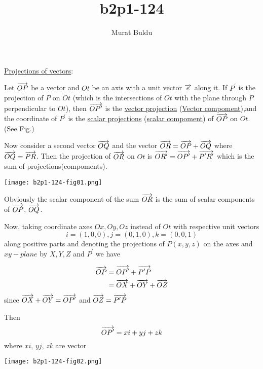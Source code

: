 \documentclass{amsbook}
\title{b2p1-124}
\author{Murat Buldu}
\begin{document}
\par
    \underline{Projections of vectors}:
\par
    Let \(\overrightarrow{OP}\) be a vector and \(Ot\) be an axis with a unit vector \(\overrightarrow{e}\) along it. If \(P^{\prime}\) is the projection of \(P\) on \(Ot\) (which is the intersections of \(Ot\) with the plane through \(P\) perpendicular to \(Ot\)), then \(\overrightarrow{OP^{\prime}}\) is the \underline{vector projection} (\underline{Vector compoment}),and the coordinate of \(P^{\prime}\) is the \underline{scalar projections} (\underline{scalar compoment}) of \(\overrightarrow{OP}\) on \(Ot\). (See Fig.)

\begin{minipage}{0.5\textwidth}
\par
Now consider a second vector \(\overrightarrow{OQ}\) and the vector \(\overrightarrow{OR} = \overrightarrow{OP} + \overrightarrow{OQ}\) where \(\overrightarrow{OQ} = \overrightarrow{PR}\). Then the projection of \(\overrightarrow{OR}\) on \(Ot\) is 
\(\overrightarrow{OR^{\prime}} = \overrightarrow{OP^{\prime}} + \overrightarrow{P^{\prime}R^{\prime}}\) which is the sum of projections(compoments).

\end{minipage}
\begin{minipage}{0.5\textwidth}
\texttt{[image: b2p1-124-fig01.png]}
\end{minipage}
\par
    Obviously the scalar component of the sum \(\overrightarrow{OR}\) is the sum of scalar components of \(\overrightarrow{OP}\), \(\overrightarrow{OQ}\).
\par
    Now, taking coordinate axes \(Ox, Oy, Oz\) instead of \(Ot\) with respective unit vectors
    \[i = (1,0,0), j = (0,1,0), k = (0,0,1) \]
    along positive parts and denoting the projections of \(P(x,y,z)\) on the axes and \(xy-plane\) by \(X,Y,Z\) and \(P^{\prime}\) we have
\par
\begin{minipage}{0.5\textwidth}
    \begin{align*} 
        \overrightarrow{OP} &= \overrightarrow{OP^{\prime}} + \overrightarrow{P^{\prime}P} \\ 
                &= \overrightarrow{OX} + \overrightarrow{OY} + \overrightarrow{OZ}
    \end{align*}
        since \(\overrightarrow{OX} + \overrightarrow{OY} = \overrightarrow{OP^{\prime}}\) and \(\overrightarrow{OZ} = \overrightarrow{P^{\prime}P}\)
    \par
        Then
        \[\overrightarrow{OP^{\prime}} = xi + yj + zk\]
        where \(xi\), \(yj\), \(zk\) are vector
\end{minipage}
\begin{minipage}{0.5\textwidth}
    \texttt{[image: b2p1-124-fig02.png]}
\end{minipage}
\end{document}
